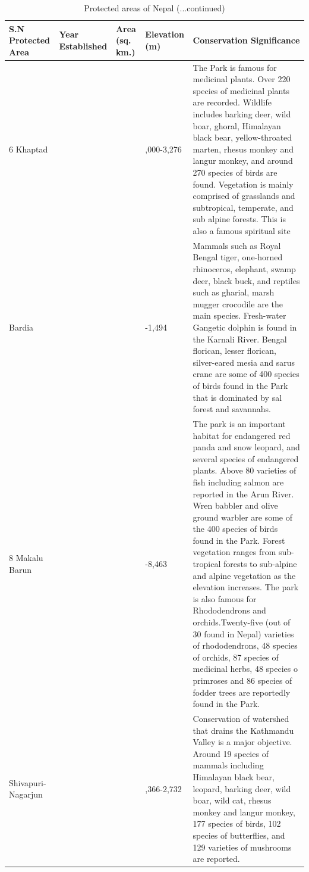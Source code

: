 \documentclass[ignorenonframetext,aspectratio=169]{beamer}
\begin{document}
\begin{frame}{}
\protect\hypertarget{section-3}{}

\begin{table}[t]

\caption{\label{tab:protected-areas-np2}Protected areas of Nepal (...continued)}
\centering
\fontsize{6}{8}\selectfont
\begin{tabular}{>{\raggedright\arraybackslash}p{8em}>{\raggedright\arraybackslash}p{5em}>{\raggedright\arraybackslash}p{5em}>{\raggedright\arraybackslash}p{6em}>{\raggedright\arraybackslash}p{40em}}
\toprule
S.N Protected Area & Year Established & Area (sq. km.) & Elevation (m) & Conservation Significance\\
\midrule
\rowcolor{gray!6}  6 Khaptad & 1984 & 225 & 1,000-3,276 & The Park is famous for medicinal plants. Over 220 species of medicinal plants are recorded. Wildlife includes barking deer, wild boar, ghoral, Himalayan black bear, yellow-throated marten, rhesus monkey and langur monkey, and around 270 species of birds are found. Vegetation is mainly comprised of grasslands and subtropical, temperate, and sub alpine forests. This is also a famous spiritual site\\
7 Bardia & 1988 & 968 & 152-1,494 & Mammals such as Royal Bengal tiger, one-horned rhinoceros, elephant, swamp deer, black buck, and reptiles such as gharial, marsh mugger crocodile are the main species. Fresh-water Gangetic dolphin is found in the Karnali River. Bengal florican, lesser florican, silver-eared mesia and sarus crane are some of 400 species of birds found in the Park that is dominated by sal forest and savannahs.\\
\rowcolor{gray!6}  8 Makalu Barun & 1991 & 1500 & 435-8,463 & The park is an important habitat for endangered red panda and snow leopard, and several species of endangered plants. Above 80 varieties of fish including salmon are reported in the Arun River. Wren babbler and olive ground warbler are some of the 400 species of birds found in the Park. Forest vegetation ranges from sub-tropical forests to sub-alpine and alpine vegetation as the elevation increases. The park is also famous for Rhododendrons and orchids.Twenty-five (out of 30 found in Nepal) varieties of rhododendrons, 48 species of orchids, 87 species of medicinal herbs, 48 species o primroses and 86 species of fodder trees are reportedly found in the Park.\\
9 Shivapuri-Nagarjun & 2002 & 159 & 1,366-2,732 & Conservation of watershed that drains the Kathmandu Valley is a major objective. Around 19 species of mammals including Himalayan black bear, leopard, barking deer, wild boar, wild cat, rhesus monkey and langur monkey, 177 species of birds, 102 species of butterflies, and 129 varieties of mushrooms are reported.\\

\end{tabular}
\end{table}
\end{frame}
\end{document}
